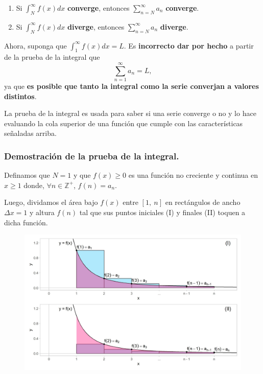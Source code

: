 \documentclass[12pt]{article}
\begin{document}
\begin{enumerate}
\item Si $\int_{N}^{\infty}f(x)dx$ \textbf{converge}, entonces $\sum_{n = N}^{\infty} a_{n}$ \textbf{converge}.
\item Si $\int_{N}^{\infty}f(x)dx$ \textbf{diverge}, entonces $\sum_{n = N}^{\infty} a_{n}$ \textbf{diverge}.
\end{enumerate}

Ahora, suponga que $\int_{1}^{\infty}f(x)dx = L$. Es \textbf{incorrecto dar por hecho} a partir de la prueba de la integral que
\[
  \sum_{n = 1}^{\infty} a_{n} = L,
\]
ya que \textbf{es posible que tanto la integral como la serie converjan a valores distintos}.

La prueba de la integral es usada para saber si una serie converge o no y lo hace evaluando la cola superior de una función que cumple con las características señaladas arriba.

\subsubsection{Demostración de la prueba de la integral.}

Definamos que $N = 1$ y que $f(x) \geq 0$ es una función no creciente y continua en $x \geq 1$ donde, $\forall n \in \mathbb{Z}^{+}$, $f(n) = a_{n}$.

Luego, dividamos el área bajo $f(x)$ entre $[1, \ n]$ en rectángulos de ancho $\Delta x = 1$ y altura $f(n)$ tal que sus puntos iniciales (I) y finales (II) toquen a dicha función.

\begin{figure}[hbt!]
\centering
\includegraphics[scale=0.7]{int-test-plot.jpg}
\end{figure}
\end{document}
